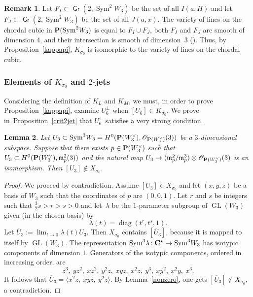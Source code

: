 \documentclass[11pt]{article}
\let\mathcal\mathscr
\newtheorem{lemm}{Lemma}[section]
\theoremstyle{definition}
\newtheorem{rema}[lemm]{Remark}
\newcommand\cO{\mathcal{O}}\let\OO\cO
\DeclareMathOperator{\Gr}{\mathsf{Gr}}
\newcommand{\gm}{\mathfrak{m}}
\let\la\langle
\let\ra\rangle
\let\ov\overline
\DeclareMathOperator{\GL}{GL}
\DeclareMathOperator{\Sym}{Sym}
\DeclareMathOperator{\diag}{diag}
\begin{document}
\begin{rema}\label{rema710}
Let $F_I\subset \Gr(2,\Sym^2\! W_3)$ be the set of all $I(a,H)$ and let $F_J\subset \Gr(2,\Sym^2\! W_3)$ be
the set of all $J(a,x)$. The variety of lines on the chordal cubic in $\PP(\Sym^2\! W_{3})$ is equal to $F_I\cup F_J$, both $F_I$ and $F_J$ are smooth of dimension $4$, and their intersection is smooth of dimension~$3$
(\cite[Prop.\,3.2.4]{vdd}). Thus, by Proposition~\ref{kappapi}, $K_{\sigma_0}$ is isomorphic to
the variety of lines on the chordal cubic.
\end{rema}

\subsubsection{Elements of $K_{\sigma_0}$ and $2$-jets}
Considering the definition of $K_L$ and $K_M$, we must, in order to prove Proposition~\ref{kappapi}, examine $U_6^{\bot}$ when $[U_6]\in K_{\sigma_0}$. We prove in~Proposition~\ref{crit2jet} that $U_6^{\bot}$ satisfies a very strong condition.

\begin{lemm}\label{stab2jet}
Let $U_3\subset \Sym^3 \!W_3=H^0(\PP(W_3^{\vee}),\cO_{\PP(W_3^{\vee})}(3))$ be a $3$-dimensional subspace. Suppose that there exists $p\in\PP(W_3^{\vee})$ such that
$U_3\subset H^0(\PP(W_3^{\vee}),\gm_p^2(3))$ and the natural map
$U_3\to (\gm_p^2/ \gm_p^3)\otimes \cO_{\PP(W_3^{\vee})}(3)$ is an isomorphism.
Then $[U_3]\notin X_{\sigma_0}$.
\end{lemm}

\begin{proof}
We proceed by contradiction. Assume $[U_3] \in X_{\sigma_0}$ and let $(x,y,z)$ be a basis of $W_3$ such that the coordinates of $p$ are $(0,0,1)$. Let $r$ and $s$ be integers such that $ \frac{3}{2}s>r>s>0$ and let~$\lambda$ be the $1$-parameter subgroup of $\GL(W_3)$ given (in the chosen basis) by
\[\label{abps}
\lambda(t)=\diag(t^{r},t^{s},1).
\]
Let $\ov{U}_3 :=\lim_{t\to 0}\lambda(t)U_3$. Then $X_{\sigma_0}$ contains $[\ov{U}_3]$, because it is mapped to itself by $\GL(W_3)$. The representation $\Sym^3\! \lambda\colon\CC^\star\to \Sym^3\! W_3$ has isotypic components of dimension $1$. Generators of the isotypic components, ordered in increasing order, are
\[
z^3,\ yz^2,\ xz^2,\ y^2z,\ xyz,\ x^2z,\ y^3,\ xy^2,\ x^2y,\ x^3.
\]
It follows that $\ov{U}_3 =\la x^2z,\ xyz,\ y^2z\ra$. By Lemma~\ref{nonzero}, one gets $[\ov{U}_3]\notin X_{\sigma_0}$, a contradiction.
\end{proof}
\end{document}
